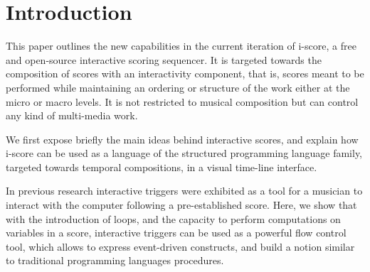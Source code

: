 \documentclass{article}
\title{\papertitle}
\begin{document}
%
\capstartfalse
\maketitle
\capstarttrue
%
\begin{abstract}
     The development and authoring of interactive music or applications, such as user interfaces for arts \& exhibitions
     has traditionally been done with tools that pertain to two broad metaphors. 
     Cue-based environments work by making groups of parameters and sending them to remote devices, 
     while more interactive applications are generally written in generic art-oriented 
     programming environments, such as Max/MSP, Processing or openFrameworks.
     In this paper, we present the current version of the i-score sequencer. 
     It is an extensive graphical software that bridges the gap between time-based, logic-based and flow-based interactive application authoring tools.
     Built upon a few simple and novel primitives that give to the composer the expressive power of structured programming, i-score provides a time line adapted to the notation of parameter-oriented interactive music, 
     and allows temporal scripting using JavaScript. We present the usage of these primitives, as well as an i-score example of work inspired from music based on polyvalent structure.
\end{abstract}
\section{Introduction}\label{sec:introduction}
This paper outlines the new capabilities in the current iteration of i-score, 
a free and open-source interactive scoring sequencer.
It is targeted towards the composition of scores with an interactivity component, that is, scores meant to be performed while maintaining an ordering or structure of the work either at the micro or macro levels.
It is not restricted to musical composition but can control any kind of multi-media work.

We first expose briefly the main ideas behind interactive scores, and explain 
how i-score can be used as a language of the structured programming language 
family, targeted towards temporal compositions, in a visual time-line interface.

In previous research\cite{hogue2014ossia,allombert2006concurrent} interactive triggers 
were exhibited as a tool for a musician to interact with the computer following a pre-established score.
Here, we show that with the introduction of loops, and the capacity to perform computations 
on variables in a score, interactive triggers can be used as a powerful flow control tool, which 
allows to express event-driven constructs, and build a notion similar to traditional programming 
languages procedures.
\end{document}
